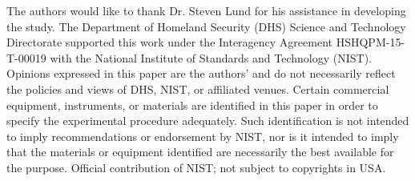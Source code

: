 \documentclass[fleqn,10pt,lineno]{wlpeerj}\usepackage[]{graphicx}\usepackage[]{color}
\begin{document}
The authors would like to thank Dr. Steven Lund for his assistance in developing the study.
The Department of Homeland Security (DHS) Science and Technology Directorate supported this work under the Interagency Agreement HSHQPM-15-T-00019 with the National Institute of Standards and Technology (NIST).
Opinions expressed in this paper are the authors’ and do not necessarily reflect the policies and views of DHS,  NIST, or affiliated venues.
Certain commercial equipment, instruments, or materials are identified in this paper in order to specify the experimental procedure adequately.
Such identification is not intended to imply recommendations or endorsement by NIST,
nor is it intended to imply that the materials or equipment identified are necessarily the best available for the purpose.
Official contribution of NIST; not subject to copyrights in USA.


\end{document}
